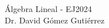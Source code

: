 \documentclass[addpoints]{exam}
\begin{document}
\begin{center}
{\Large Álgebra Lineal - EJ2024
\\
\vspace{5mm}
Dr. David Gómez Gutiérrez}
\vspace{0.5cm}

\fbox{\fbox{\parbox{5.5in}{\centering

%

}}}
\end{center}

\vspace{5mm}


\vspace{5mm}



\pagebreak

\begin{questions}
        
   
            
\end{questions}
\end{document}
